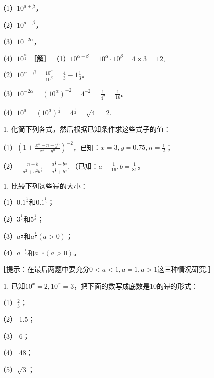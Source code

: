 （1）\(10^{a + \beta}\)，

（2）\(10^{a - \beta}\)，

（3）\(10^{-2\alpha}\)，

（4）\(10^{\frac{\alpha}{2}}\) \textbf{［解］}
（1）\(10^{\alpha + \beta} = 10^{\alpha} \cdot 10^{\beta} = 4 \times 3 = 12,\)

（2）\(10^{\alpha - \beta} = \frac{10^{\alpha}}{10^{\beta}} = \frac{4}{3} - 1\frac{1}{3}\)。

（3）\(10^{-2\alpha} = (10^{\alpha})^{-2} = 4^{-2} = \frac{1}{4^{2}} = \frac{1}{16}\)。

（4）\(10^{a} = (10^{a})^{\frac{1}{2}} = 4^{\frac{1}{2}} = \sqrt{4} = 2.\)

\begin{enumerate}
\item
  化简下列各式，然后根据已知条件求这些式子的值：
\end{enumerate}

（1）\(\left(1 + \frac{x^n - n + y^n}{x^n - y^n}\right)^{-2}\)，已知：\(x = 3, y = 0.75, n = \frac{1}{2}\)；

（2）\(-\frac{n - b}{a^2 + a^2b^{\frac{1}{2}}} - \frac{a^{\frac{1}{2}} - b^{\frac{1}{2}}}{a^{\frac{1}{2}} + b^{\frac{1}{2}}},\)（已知：\(a - \frac{1}{16}, b = \frac{1}{81}\)。

\begin{enumerate}[start=2]
\item
  比较下列这些幂的大小：
\end{enumerate}

（1）\(0.1^{\frac{1}{2}}\)和\(0.1^{\frac{1}{3}}\)；

（2）\(3^{\frac{1}{2}}\)和\(5^{\frac{1}{3}}\)；

（3）\(a^{\frac{1}{2}}\)和\(a^{\frac{1}{3}} (a > 0)\)；

（4）\(a^{-\frac{1}{2}}\)和\(a^{-\frac{1}{3}} (a > 0)\)。

［提示：在最后两题中要充分\(0 < a < 1, a = 1, a > 1\)这三种情况研究.］

\begin{enumerate}[start=3]
\item
  已知\(10^{x} = 2, 10^{x} = 3\)，把下面的数写成底数是10的幂的形式：
\end{enumerate}

（1）\(\frac{2}{3}\)；

（2） 1.5；

（3） 6；

（4） 48；

（5）\(\sqrt{3}\)；

